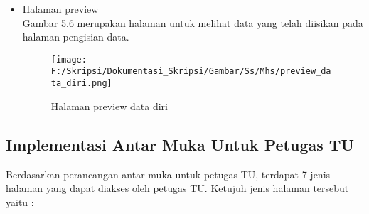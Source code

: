 \begin{itemize}
	\item Halaman preview\\
	Gambar \hyperlink{halaman_preview_data_diri}{5.6} merupakan halaman untuk melihat data yang telah diisikan pada halaman pengisian data.
	\begin{figure}[H]
	\centering
		\texttt{[image: F:/Skripsi/Dokumentasi\_Skripsi/Gambar/Ss/Mhs/preview\_data\_diri.png]}
		\caption{Halaman preview data diri}
		\label{fig:halaman_preview_data_diri}
	\end{figure}
\end{itemize}

\subsection{Implementasi Antar Muka Untuk Petugas TU}
\label{sec:implementasi_antar_muka_petugas_tu}
Berdasarkan perancangan antar muka untuk petugas TU, terdapat 7 jenis halaman yang dapat diakses oleh petugas TU. Ketujuh jenis halaman tersebut yaitu :
